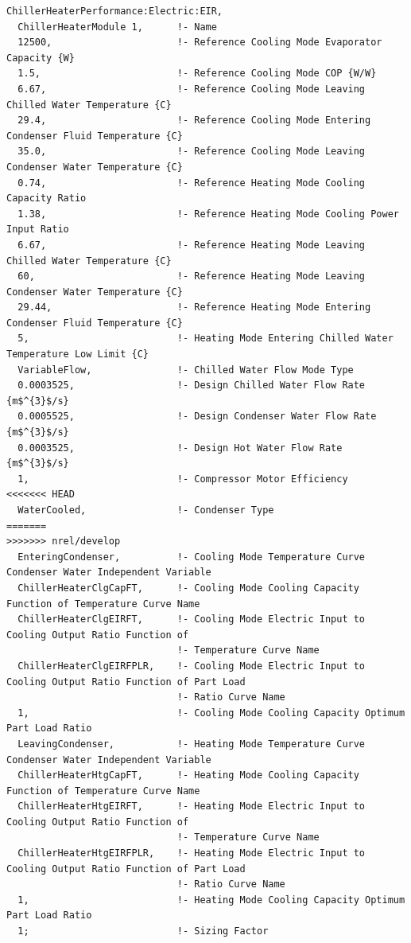 \begin{lstlisting}
ChillerHeaterPerformance:Electric:EIR,
  ChillerHeaterModule 1,      !- Name
  12500,                      !- Reference Cooling Mode Evaporator Capacity {W}
  1.5,                        !- Reference Cooling Mode COP {W/W}
  6.67,                       !- Reference Cooling Mode Leaving Chilled Water Temperature {C}
  29.4,                       !- Reference Cooling Mode Entering Condenser Fluid Temperature {C}
  35.0,                       !- Reference Cooling Mode Leaving Condenser Water Temperature {C}
  0.74,                       !- Reference Heating Mode Cooling Capacity Ratio
  1.38,                       !- Reference Heating Mode Cooling Power Input Ratio
  6.67,                       !- Reference Heating Mode Leaving Chilled Water Temperature {C}
  60,                         !- Reference Heating Mode Leaving Condenser Water Temperature {C}
  29.44,                      !- Reference Heating Mode Entering Condenser Fluid Temperature {C}
  5,                          !- Heating Mode Entering Chilled Water Temperature Low Limit {C}
  VariableFlow,               !- Chilled Water Flow Mode Type
  0.0003525,                  !- Design Chilled Water Flow Rate {m$^{3}$/s}
  0.0005525,                  !- Design Condenser Water Flow Rate {m$^{3}$/s}
  0.0003525,                  !- Design Hot Water Flow Rate {m$^{3}$/s}
  1,                          !- Compressor Motor Efficiency
<<<<<<< HEAD
  WaterCooled,                !- Condenser Type
=======
>>>>>>> nrel/develop
  EnteringCondenser,          !- Cooling Mode Temperature Curve Condenser Water Independent Variable
  ChillerHeaterClgCapFT,      !- Cooling Mode Cooling Capacity Function of Temperature Curve Name
  ChillerHeaterClgEIRFT,      !- Cooling Mode Electric Input to Cooling Output Ratio Function of
                              !- Temperature Curve Name
  ChillerHeaterClgEIRFPLR,    !- Cooling Mode Electric Input to Cooling Output Ratio Function of Part Load
                              !- Ratio Curve Name
  1,                          !- Cooling Mode Cooling Capacity Optimum Part Load Ratio
  LeavingCondenser,           !- Heating Mode Temperature Curve Condenser Water Independent Variable
  ChillerHeaterHtgCapFT,      !- Heating Mode Cooling Capacity Function of Temperature Curve Name
  ChillerHeaterHtgEIRFT,      !- Heating Mode Electric Input to Cooling Output Ratio Function of
                              !- Temperature Curve Name
  ChillerHeaterHtgEIRFPLR,    !- Heating Mode Electric Input to Cooling Output Ratio Function of Part Load
                              !- Ratio Curve Name
  1,                          !- Heating Mode Cooling Capacity Optimum Part Load Ratio
  1;                          !- Sizing Factor
\end{lstlisting}

